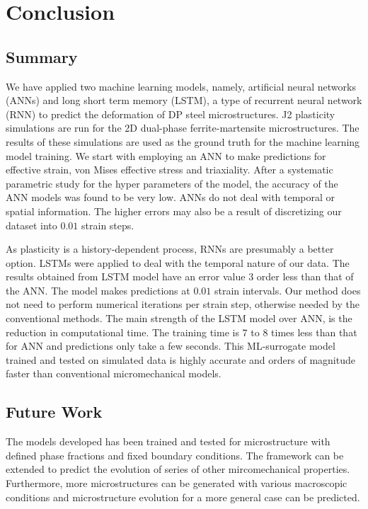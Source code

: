 
\chapter{Conclusion} %

\label{Chapter5} %



\section{Summary}

We have applied two machine learning models, namely, artificial neural networks (ANNs) and long short term memory (LSTM), a type of recurrent neural network (RNN) to predict the deformation of DP steel microstructures. J2 plasticity simulations are run for the 2D dual-phase ferrite-martensite microstructures. The results of these simulations are used as the ground truth for the machine learning model training. We start with employing an ANN to make predictions for effective strain, von Mises effective stress and triaxiality. After a systematic parametric study for the hyper parameters of the model, the accuracy of the ANN models was found to be very low. ANNs do not deal with temporal or spatial information. The higher errors may also be a result of discretizing our dataset into $0.01$ strain steps. 

As plasticity is a history-dependent process, RNNs are presumably a better option. LSTMs were applied to deal with the temporal nature of our data. The results obtained from LSTM model have an error value 3 order less than that of the ANN. The model makes predictions at $0.01$ strain intervals. Our method does not need to perform numerical iterations per strain step, otherwise needed by the conventional methods. The main strength of the LSTM model over ANN, is the reduction in computational time. The training time is 7 to 8 times less than that for ANN and predictions only take a few seconds. This ML-surrogate model trained and tested on simulated data is highly accurate and orders of magnitude faster than conventional micromechanical models. 

\section{Future Work}
The models developed has been trained and tested for microstructure with defined phase fractions and fixed boundary conditions. The framework can be extended to predict the evolution of series of other mircomechanical properties. Furthermore, more microstructures can be generated with various macroscopic conditions and microstructure evolution for a more general case can be predicted. 
